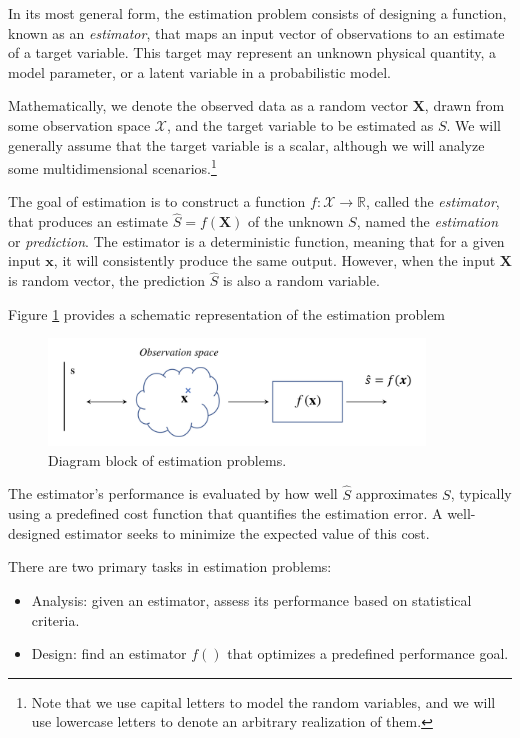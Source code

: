 {\color{blue} In its most general form, the estimation problem consists of designing a function, known as an \textit{estimator}, that maps an input vector of observations to an estimate of a target variable. This target may represent an unknown physical quantity, a model parameter, or a latent variable in a probabilistic model.

Mathematically, we denote the observed data as a random vector $\mathbf{X}$, drawn from some observation space $\mathcal{X}$, and the target variable to be estimated as $S$. We will generally assume that the target variable is a scalar, although we will analyze some multidimensional scenarios.\footnote{Note that we use capital letters to model the random variables, and we will use lowercase letters to denote an arbitrary realization of them.} 

The goal of estimation is to construct a function $f: \mathcal{X} \to \mathbb{R}$, called the \textit{estimator}, that produces an estimate $\hat{S} = f(\mathbf{X})$ of the unknown $S$, named the \textit{estimation} or \textit{prediction}. The estimator is a deterministic function, meaning that for a given input $\mathbf{x}$, it will consistently produce the same output. However, when the input $\mathbf{X}$ is random vector, the prediction $\hat{S}$ is also a random variable.

Figure \ref{fig:est_overview} provides a schematic representation of the estimation problem

\begin{figure}
\begin{center}
\includegraphics[width=10cm]{Figures//estimation_overview.png}
\end{center}
\caption{Diagram block of estimation problems.\label{fig:est_overview}}
\end{figure}

The estimator's performance is evaluated by how well $\hat{S}$ approximates $S$, typically using a predefined cost function that quantifies the estimation error. A well-designed estimator seeks to minimize the expected value of this cost.

There are two primary tasks in estimation problems:
\begin{itemize}
\item Analysis: given an estimator, assess its performance based on statistical criteria.
\item Design: find an estimator $f()$ that optimizes a predefined performance goal.
\end{itemize}
}

